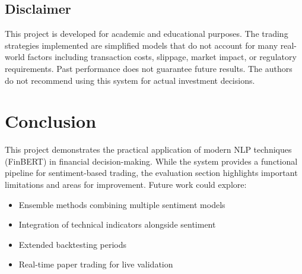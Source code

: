 \documentclass[12pt]{article}
\begin{document}
\subsection{Disclaimer}

This project is developed for academic and educational purposes. The trading strategies implemented are simplified models that do not account for many real-world factors including transaction costs, slippage, market impact, or regulatory requirements. Past performance does not guarantee future results. The authors do not recommend using this system for actual investment decisions.

\section{Conclusion}

This project demonstrates the practical application of modern NLP techniques (FinBERT) in financial decision-making. While the system provides a functional pipeline for sentiment-based trading, the evaluation section highlights important limitations and areas for improvement. Future work could explore:
\begin{itemize}
\item Ensemble methods combining multiple sentiment models
\item Integration of technical indicators alongside sentiment
\item Extended backtesting periods
\item Real-time paper trading for live validation
\end{itemize}
\end{document}
